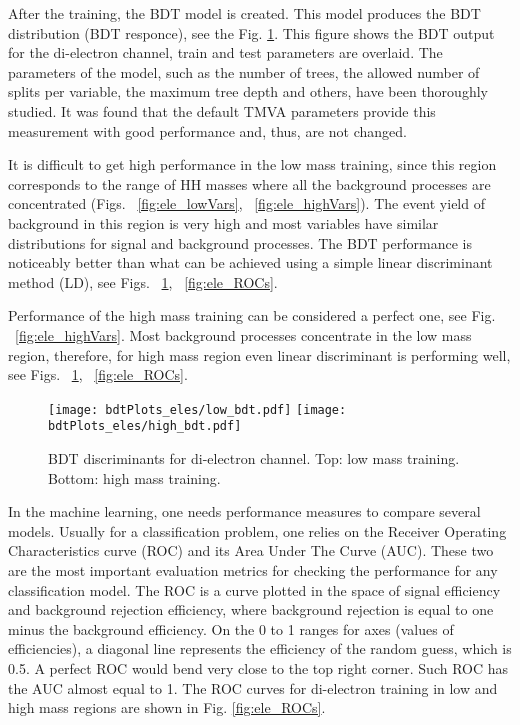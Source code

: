 After the training, the BDT model is created. This model produces the BDT distribution (BDT responce), see the Fig. \ref{fig:ele_BDTs}. This figure shows the BDT output for the di-electron channel, train and test parameters are overlaid. The parameters of the model, such as the number of trees, the allowed number of splits per variable, the maximum tree depth and others, have been thoroughly studied. It was found that the default TMVA parameters provide this measurement with good performance and, thus, are not changed.

It is difficult to get high performance in the low mass training, since
this region corresponds to the range of HH masses where all the background processes are concentrated (Figs. ~\ref{fig:ele_lowVars}, ~\ref{fig:ele_highVars}). The event yield of background in this region is very high and most variables have similar distributions for signal and background processes. The BDT performance is noticeably better than what can be achieved using a simple linear discriminant method (LD), see Figs. ~\ref{fig:ele_BDTs}, ~\ref{fig:ele_ROCs}.

Performance of the high mass training can be considered a perfect one, see Fig. ~\ref{fig:ele_highVars}. Most background processes concentrate in the low mass region, therefore, for high mass region even linear
discriminant is performing well, see Figs. ~\ref{fig:ele_BDTs}, ~\ref{fig:ele_ROCs}.

\begin{figure}[H]
  \begin{center}
   \texttt{[image: bdtPlots\_eles/low\_bdt.pdf]}
   \texttt{[image: bdtPlots\_eles/high\_bdt.pdf]}
    \caption[BDT discriminants for di-electron channel.]{ BDT discriminants for di-electron channel. Top: low mass training. Bottom: high mass training. }
    \label{fig:ele_BDTs}
  \end{center}
\end{figure}

In the machine learning, one needs performance measures to compare several models. Usually for a classification problem, one relies on the Receiver Operating Characteristics curve (ROC) and its Area Under The Curve (AUC). These two are the most important evaluation metrics for checking the performance for any classification model. The ROC is a curve plotted in the space of signal efficiency and background rejection efficiency, where background rejection is equal to one minus the background efficiency. On the 0 to 1 ranges for axes (values of efficiencies), a diagonal line represents the efficiency of the random guess, which is 0.5. A perfect ROC would bend very close to the top right corner. Such ROC has the AUC almost equal to 1. The ROC curves for di-electron training in low and high mass regions are shown in Fig. \ref{fig:ele_ROCs}. 
                      
